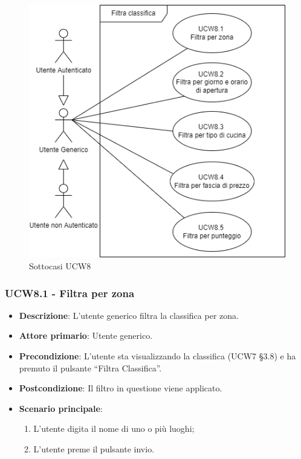 \begin{figure}[!h]
\centering
    \includegraphics[scale=0.5]{UC_images/UCW8-.png}
    \caption{Sottocasi UCW8}
\end{figure}

\subsubsection{UCW8.1 - Filtra per zona}
\begin{itemize}
	\item \textbf{Descrizione}: L'utente generico filtra la classifica per zona.
    \item \textbf{Attore primario}: Utente generico.
    \item \textbf{Precondizione}: L’utente sta visualizzando la classifica (UCW7 §3.8) e ha premuto il pulsante “Filtra Classifica”.
    \item \textbf{Postcondizione}: Il filtro in questione viene applicato.
    \item \textbf{Scenario principale}: 
    \begin{enumerate}
        \item L’utente digita il nome di uno o più luoghi;
        \item L’utente preme il pulsante invio.
    \end{enumerate}
\end{itemize}

